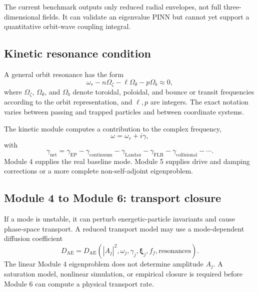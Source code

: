 The current benchmark outputs only reduced radial envelopes, not full three-dimensional fields. It can validate an eigenvalue PINN but cannot yet support a quantitative orbit-wave coupling integral.

\subsection{Kinetic resonance condition}
A general orbit resonance has the form
\begin{equation}
\omega_r-n\Omega_\zeta-\ell\Omega_\theta-p\Omega_b\approx0,
\label{eq:general_orbit_resonance}
\end{equation}
where $\Omega_\zeta$, $\Omega_\theta$, and $\Omega_b$ denote toroidal, poloidal, and bounce or transit frequencies according to the orbit representation, and $\ell,p$ are integers. The exact notation varies between passing and trapped particles and between coordinate systems.

The kinetic module computes a contribution to the complex frequency,
\begin{equation}
\omega=\omega_r+i\gamma,
\end{equation}
with
\begin{equation}
\gamma_{\mathrm{net}}=
\gamma_{\mathrm{EP}}
-\gamma_{\mathrm{continuum}}
-\gamma_{\mathrm{Landau}}
-\gamma_{\mathrm{FLR}}
-\gamma_{\mathrm{collisional}}
-\cdots.
\end{equation}
Module 4 supplies the real baseline mode. Module 5 supplies drive and damping corrections or a more complete non-self-adjoint eigenproblem.

\subsection{Module 4 to Module 6: transport closure}
If a mode is unstable, it can perturb energetic-particle invariants and cause phase-space transport. A reduced transport model may use a mode-dependent diffusion coefficient
\begin{equation}
D_{\mathrm{AE}}=D_{\mathrm{AE}}
\left(|A_j|^2,\omega_j,\gamma_j,\boldsymbol\xi_j,f_f,\text{resonances}\right).
\end{equation}
The linear Module 4 eigenproblem does not determine amplitude $A_j$. A saturation model, nonlinear simulation, or empirical closure is required before Module 6 can compute a physical transport rate.

